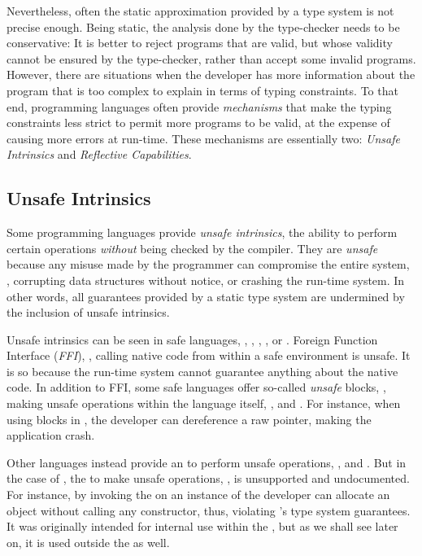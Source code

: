 Nevertheless, often the static approximation provided by a type system is not precise enough.
Being static, the analysis done by the type-checker needs to be conservative:
It is better to reject programs that are valid,
but whose validity cannot be ensured by the type-checker,
rather than accept some invalid programs.
However, there are situations when the developer has more information
about the program that is too complex to explain in terms of typing constraints.
To that end, programming languages often provide \emph{mechanisms} that 
make the typing constraints less strict
to permit more programs to be valid,
at the expense of causing more errors at run-time.
These mechanisms are essentially two:
\emph{Unsafe Intrinsics} and \emph{Reflective Capabilities}.

\subsection*{Unsafe Intrinsics}

Some programming languages provide \emph{unsafe intrinsics},
the ability to perform certain operations \emph{without} being checked by the compiler.
They are \emph{unsafe} because any misuse made by the programmer can compromise the entire system, \eg{},
corrupting data structures without notice, or
crashing the run-time system.
In other words,
all guarantees provided by a static type system are undermined by the inclusion of unsafe intrinsics.

Unsafe intrinsics can be seen in safe languages, \eg{},
\java{}, \csharp{}, \rust{}, or \haskell{}.
Foreign Function Interface (\emph{FFI}), \ie{}, calling native code from within a safe environment is unsafe.
It is so because the run-time system cannot guarantee anything about the native code.
In addition to FFI,
some safe languages offer so-called \emph{unsafe} blocks, \ie{},
making unsafe operations within the language itself, \eg{},
\csharp{}%
and
\rust{}.%
For instance,
when using  blocks in \rust{},
the developer can dereference a raw pointer,
making the application crash.

Other languages instead provide an \api{} to perform unsafe operations,
\eg{}, \haskell{}%
and \java{}.
But in the case of \java{}, the \api{} to make unsafe operations,
\smu{}, is unsupported%
and undocumented.
For instance,
by invoking the  on an instance of \smu{}
the developer can allocate an object without calling any constructor,
thus, violating \java{}'s type system guarantees.
It was originally intended for internal use within the \jdk{},
but as we shall see later on, it is used outside the \jdk{} as well.

